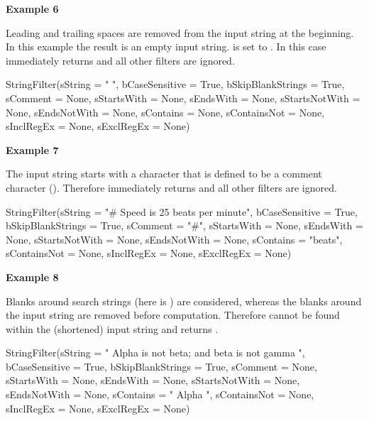 \textbf{Example 6}

Leading and trailing spaces are removed from the input string  at the beginning. In this example the result is an empty input string.
 is set to . In this case  immediately returns 
and all other filters are ignored.

\begin{pythoncode}
StringFilter(sString           = "     ",
             bCaseSensitive    = True,
             bSkipBlankStrings = True,
             sComment          = None,
             sStartsWith       = None,
             sEndsWith         = None,
             sStartsNotWith    = None,
             sEndsNotWith      = None,
             sContains         = None,
             sContainsNot      = None,
             sInclRegEx        = None,
             sExclRegEx        = None)
\end{pythoncode}

\newpage

\textbf{Example 7}

The input string  starts with a character that is defined to be a comment character ().
Therefore  immediately returns  and all other filters are ignored.

\begin{pythoncode}
StringFilter(sString           = "# Speed is 25 beats per minute",
             bCaseSensitive    = True,
             bSkipBlankStrings = True,
             sComment          = "#",
             sStartsWith       = None,
             sEndsWith         = None,
             sStartsNotWith    = None,
             sEndsNotWith      = None,
             sContains         = "beats",
             sContainsNot      = None,
             sInclRegEx        = None,
             sExclRegEx        = None)
\end{pythoncode}

\textbf{Example 8}

Blanks around search strings (here  is ) are considered, whereas the blanks around the input string are removed before computation.
Therefore  cannot be found within the (shortened) input string and  returns .

\begin{pythoncode}
StringFilter(sString           = "   Alpha is not beta; and beta is not gamma  ",
             bCaseSensitive    = True,
             bSkipBlankStrings = True,
             sComment          = None,
             sStartsWith       = None,
             sEndsWith         = None,
             sStartsNotWith    = None,
             sEndsNotWith      = None,
             sContains         = "   Alpha ",
             sContainsNot      = None,
             sInclRegEx        = None,
             sExclRegEx        = None)
\end{pythoncode}

